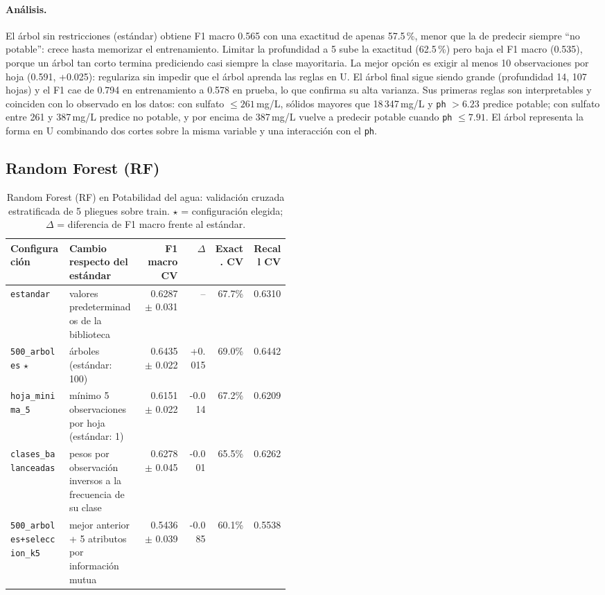 \documentclass[11pt]{article}
\begin{document}
\paragraph{Análisis.} El árbol sin restricciones (estándar) obtiene F1 macro 0.565 con una exactitud de
apenas 57.5\,\%, menor que la de predecir siempre ``no potable'': crece hasta
memorizar el entrenamiento. Limitar la profundidad a 5 sube la exactitud (62.5\,\%)
pero baja el F1 macro (0.535), porque un árbol tan corto termina prediciendo casi
siempre la clase mayoritaria. La mejor opción es exigir al menos 10 observaciones por
hoja (0.591, +0.025): regulariza sin impedir que el árbol aprenda las reglas en U. El
árbol final sigue siendo grande (profundidad 14, 107 hojas) y el F1 cae de 0.794 en
entrenamiento a 0.578 en prueba, lo que confirma su alta varianza. Sus primeras reglas
son interpretables y coinciden con lo observado en los datos: con sulfato
$\le 261$\,mg/L, sólidos mayores que 18\,347\,mg/L y \texttt{ph} $>6.23$ predice potable; con sulfato entre 261 y
387\,mg/L predice no potable, y por encima de 387\,mg/L vuelve a predecir potable
cuando \texttt{ph} $\le 7.91$. El árbol representa la forma en U combinando dos cortes
sobre la misma variable y una interacción con el \texttt{ph}.

\FloatBarrier

\subsection{Random Forest (RF)}

\begin{table}[H]\centering\footnotesize
\caption{Random Forest (RF) en Potabilidad del agua: validación cruzada estratificada de 5 pliegues sobre train. $\star$ = configuración elegida; $\Delta$ = diferencia de F1 macro frente al estándar.}
\begin{tabular}{>{\raggedright\arraybackslash}p{0.21\linewidth}>{\raggedright\arraybackslash}p{0.26\linewidth}rrrr}\toprule
Configuración & Cambio respecto del estándar & F1 macro CV & $\Delta$ & Exact. CV & Recall CV \\ \midrule
\texttt{estandar} & valores predeterminados de la biblioteca & 0.6287 $\pm$ 0.031 & -- & 67.7\% & 0.6310 \\
\texttt{500\_\allowbreak{}arboles} $\star$ & 500 árboles (estándar: 100) & 0.6435 $\pm$ 0.022 & +0.015 & 69.0\% & 0.6442 \\
\texttt{hoja\_\allowbreak{}minima\_\allowbreak{}5} & mínimo 5 observaciones por hoja (estándar: 1) & 0.6151 $\pm$ 0.022 & -0.014 & 67.2\% & 0.6209 \\
\texttt{clases\_\allowbreak{}balanceadas} & pesos por observación inversos a la frecuencia de su clase & 0.6278 $\pm$ 0.045 & -0.001 & 65.5\% & 0.6262 \\
\texttt{500\_\allowbreak{}arboles+\allowbreak{}seleccion\_\allowbreak{}k5} & mejor anterior + 5 atributos por información mutua & 0.5436 $\pm$ 0.039 & -0.085 & 60.1\% & 0.5538 \\
\bottomrule\end{tabular}
\end{table}
\end{document}

